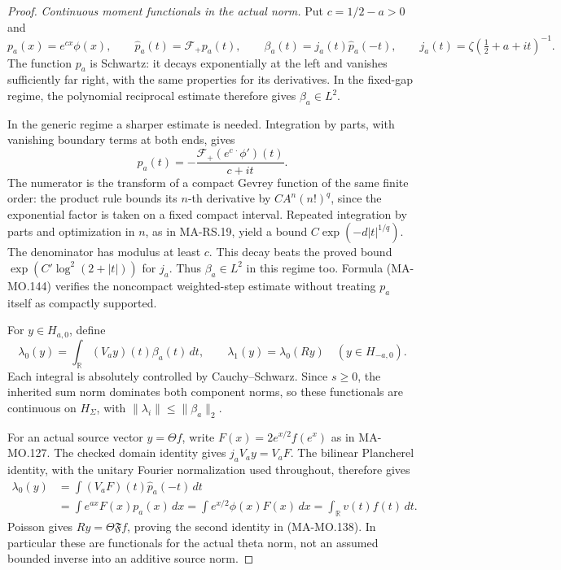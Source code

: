 \begin{proof}
\emph{Continuous moment functionals in the actual norm.}
Put \(c=1/2-a>0\) and
\[
 p_a(x)=e^{cx}\phi(x),\qquad
 \widehat p_a(t)=\mathcal F_+p_a(t),\qquad
 \beta_a(t)=j_a(t)\widehat p_a(-t),
             \qquad j_a(t)=\zeta(\tfrac12+a+it)^{-1}.
 \tag{MA-MO.143}
\]
The function \(p_a\) is Schwartz: it decays exponentially
at the left and vanishes sufficiently far right, with the
same properties for its derivatives. In the fixed-gap regime,
the polynomial reciprocal estimate therefore gives
\(\beta_a\in L^2\).

In the generic regime a sharper estimate is needed. Integration
by parts, with vanishing boundary terms at both ends, gives
\[
 \widehat p_a(t)=
       -\frac{\mathcal F_+(e^{c\,\cdot}\phi')(t)}{c+it}.
 \tag{MA-MO.144}
\]
The numerator is the transform of a compact Gevrey function
of the same finite order: the product rule bounds its
\(n\)-th derivative by \(C A^n(n!)^q\), since the exponential
factor is taken on a fixed compact interval. Repeated
integration by parts and optimization in \(n\), as in
MA-RS.19, yield a bound \(C\exp(-d|t|^{1/q})\).
The denominator has modulus at least \(c\). This decay beats
the proved bound \(\exp(C'\log^2(2+|t|))\) for \(j_a\).
Thus \(\beta_a\in L^2\) in this regime too. Formula
(MA-MO.144) verifies the noncompact weighted-step estimate
without treating \(p_a\) itself as compactly supported.

For \(y\in H_{a,0}\), define
\[
        \lambda_0(y)=\int_{\mathbb R}(V_ay)(t)\beta_a(t)\,dt,
                 \qquad \lambda_1(y)=\lambda_0(Ry)
                       \quad(y\in H_{-a,0}).
 \tag{MA-MO.145}
\]
Each integral is absolutely controlled by Cauchy--Schwarz.
Since \(s\ge0\), the inherited sum norm dominates both
component norms, so these functionals are continuous on
\(H_\Sigma\), with
\(\|\lambda_i\|\le\|\beta_a\|_2\).

For an actual source vector \(y=\Theta f\), write
\(F(x)=2e^{x/2}f(e^x)\) as in MA-MO.127.
The checked domain identity gives \(j_aV_ay=V_aF\).
The bilinear Plancherel identity, with the unitary Fourier
normalization used throughout, therefore gives
\[
 \begin{aligned}
 \lambda_0(y)
 &=\int (V_aF)(t)\widehat p_a(-t)\,dt\\
 &=\int e^{ax}F(x)p_a(x)\,dx
   =\int e^{x/2}\phi(x)F(x)\,dx
   =\int_{\mathbb R}v(t)f(t)\,dt.
 \end{aligned}
 \tag{MA-MO.146}
\]
Poisson gives \(Ry=\Theta\mathfrak Ff\), proving the
second identity in (MA-MO.138). In particular these are
functionals for the actual theta norm, not an assumed
bounded inverse into an additive source norm.


\end{proof}

